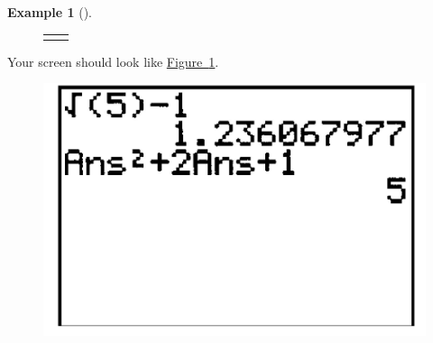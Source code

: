 \documentclass[10pt,]{book}
\theoremstyle{plain}
\theoremstyle{definition}
\theoremstyle{definition}
\newtheorem{example}[theorem]{Example}
\theoremstyle{definition}
\numberwithin{equation}{part}
\newlength{\panelmax}
\begin{document}
\begin{example}[]
\begin{enumerate}[label=*\alph**]
{%
\setlength{\panelmax}{0pt}
\newsavebox{\panelboxAKTp}
\newlength{\phAKTp}\setlength{\phAKTp}{\ht\panelboxAKTp+\dp\panelboxAKTp}
\settototalheight{\phAKTp}{\usebox{\panelboxAKTp}}
\setlength{\panelmax}{\maxof{\panelmax}{\phAKTp}}
\newsavebox{\panelboxAKUp}
\newlength{\phAKUp}\setlength{\phAKUp}{\ht\panelboxAKUp+\dp\panelboxAKUp}
\settototalheight{\phAKUp}{\usebox{\panelboxAKUp}}
\setlength{\panelmax}{\maxof{\panelmax}{\phAKUp}}
\leavevmode%
\setlength{\tabcolsep}{0.025\textwidth}
\begin{figure}
\begin{tabular}{@{}*{2}{c}@{}}
\begin{minipage}[c][\panelmax][t]{0.65\textwidth}\usebox{\panelboxAKTp}\end{minipage}&
\begin{minipage}[c][\panelmax][t]{0.3\textwidth}\usebox{\panelboxAKUp}\end{minipage}\end{tabular}
\end{figure}
}%
 Your screen should look like \hyperref[fig-GC-sum-of-roots3]{Figure~\ref{fig-GC-sum-of-roots3}}. \leavevmode%
\begin{figure}
\centering
\includegraphics[width=0.25\linewidth]{images/fig-GC-sum-of-roots3.jpg}
\caption{\label{fig-GC-sum-of-roots3}}
\end{figure}
%
\end{enumerate}
%
\end{example}
\typeout{************************************************}
\typeout{************************************************}
\end{document}
